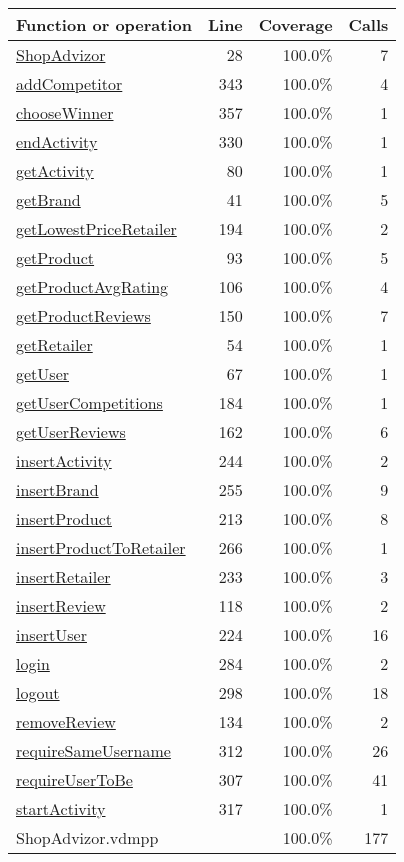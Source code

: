 \begin{longtable}{|l|r|r|r|}
\hline
Function or operation & Line & Coverage & Calls \\
\hline
\hline
\hyperref[ShopAdvizor:28]{ShopAdvizor} & 28&100.0\% & 7 \\
\hline
\hyperref[addCompetitor:343]{addCompetitor} & 343&100.0\% & 4 \\
\hline
\hyperref[chooseWinner:357]{chooseWinner} & 357&100.0\% & 1 \\
\hline
\hyperref[endActivity:330]{endActivity} & 330&100.0\% & 1 \\
\hline
\hyperref[getActivity:80]{getActivity} & 80&100.0\% & 1 \\
\hline
\hyperref[getBrand:41]{getBrand} & 41&100.0\% & 5 \\
\hline
\hyperref[getLowestPriceRetailer:194]{getLowestPriceRetailer} & 194&100.0\% & 2 \\
\hline
\hyperref[getProduct:93]{getProduct} & 93&100.0\% & 5 \\
\hline
\hyperref[getProductAvgRating:106]{getProductAvgRating} & 106&100.0\% & 4 \\
\hline
\hyperref[getProductReviews:150]{getProductReviews} & 150&100.0\% & 7 \\
\hline
\hyperref[getRetailer:54]{getRetailer} & 54&100.0\% & 1 \\
\hline
\hyperref[getUser:67]{getUser} & 67&100.0\% & 1 \\
\hline
\hyperref[getUserCompetitions:184]{getUserCompetitions} & 184&100.0\% & 1 \\
\hline
\hyperref[getUserReviews:162]{getUserReviews} & 162&100.0\% & 6 \\
\hline
\hyperref[insertActivity:244]{insertActivity} & 244&100.0\% & 2 \\
\hline
\hyperref[insertBrand:255]{insertBrand} & 255&100.0\% & 9 \\
\hline
\hyperref[insertProduct:213]{insertProduct} & 213&100.0\% & 8 \\
\hline
\hyperref[insertProductToRetailer:266]{insertProductToRetailer} & 266&100.0\% & 1 \\
\hline
\hyperref[insertRetailer:233]{insertRetailer} & 233&100.0\% & 3 \\
\hline
\hyperref[insertReview:118]{insertReview} & 118&100.0\% & 2 \\
\hline
\hyperref[insertUser:224]{insertUser} & 224&100.0\% & 16 \\
\hline
\hyperref[login:284]{login} & 284&100.0\% & 2 \\
\hline
\hyperref[logout:298]{logout} & 298&100.0\% & 18 \\
\hline
\hyperref[removeReview:134]{removeReview} & 134&100.0\% & 2 \\
\hline
\hyperref[requireSameUsername:312]{requireSameUsername} & 312&100.0\% & 26 \\
\hline
\hyperref[requireUserToBe:307]{requireUserToBe} & 307&100.0\% & 41 \\
\hline
\hyperref[startActivity:317]{startActivity} & 317&100.0\% & 1 \\
\hline
\hline
ShopAdvizor.vdmpp & & 100.0\% & 177 \\
\hline
\end{longtable}

